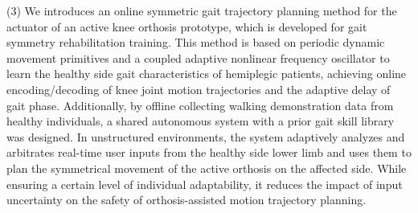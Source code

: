 \begin{abstract*}
(3) We introduces an online symmetric gait trajectory planning method for the actuator of an active knee orthosis prototype, which is developed for gait symmetry rehabilitation training. This method is based on periodic dynamic movement primitives and a coupled adaptive nonlinear frequency oscillator to learn the healthy side gait characteristics of hemiplegic patients, achieving online encoding/decoding of knee joint motion trajectories and the adaptive delay of gait phase. Additionally, by offline collecting walking demonstration data from healthy individuals, a shared autonomous system with a prior gait skill library was designed. In unstructured environments, the system adaptively analyzes and arbitrates real-time user inputs from the healthy side lower limb and uses them to plan the symmetrical movement of the active orthosis on the affected side. While ensuring a certain level of individual adaptability, it reduces the impact of input uncertainty on the safety of orthosis-assisted motion trajectory planning.
\end{abstract*}
